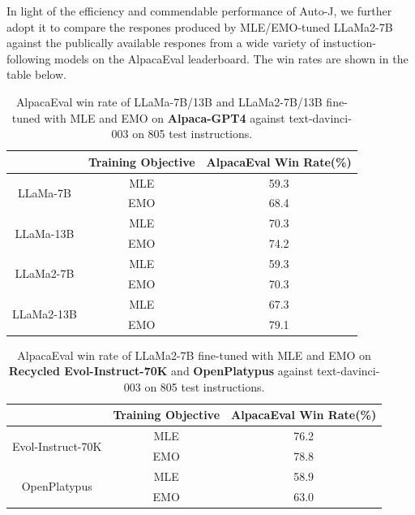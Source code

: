 In light of the efficiency and commendable performance of Auto-J, we further adopt it to compare the respones produced by MLE/EMO-tuned LLaMa2-7B against the publically available respones from a wide variety of instuction-following models on the AlpacaEval leaderboard. The win rates are shown in the table below.

\begin{table}[t]
    \centering
    \begin{tabular}{cc|c}
    \toprule
                              & \textbf{Training Objective} & \textbf{AlpacaEval Win Rate(\%)} \\
    \midrule
    \multirow{2}{*}{LLaMa-7B}  & MLE                & 59.3                \\
                               & EMO                & 68.4                \\
    \midrule
    \multirow{2}{*}{LLaMa-13B} & MLE                & 70.3                \\
                               & EMO                & 74.2                \\
    \midrule
    \multirow{2}{*}{LLaMa2-7B}  & MLE                & 59.3                \\
                               & EMO                &  70.3               \\
    \midrule
    \multirow{2}{*}{LLaMa2-13B} & MLE                & 67.3                \\
                               & EMO                & 79.1                \\
    \bottomrule
    \end{tabular}
    \label{table:alpacaeval}
    \caption{AlpacaEval win rate of LLaMa-7B/13B and LLaMa2-7B/13B fine-tuned with MLE and EMO on \textbf{Alpaca-GPT4} against text-davinci-003 on 805 test instructions.}
\end{table}

\begin{table}[t]
    \centering
    \begin{tabular}{cc|c}
    \toprule
                              & \textbf{Training Objective} & \textbf{AlpacaEval Win Rate(\%)} \\
    \midrule
    \multirow{2}{*}{Evol-Instruct-70K}  & MLE                & 76.2                \\
                               & EMO                &  78.8               \\
    \midrule
    \multirow{2}{*}{OpenPlatypus} & MLE                & 58.9                \\
                               & EMO                & 63.0                \\
    \bottomrule
    \end{tabular}
    \label{table:alpacaeval_evol}
    \caption{AlpacaEval win rate of LLaMa2-7B fine-tuned with MLE and EMO on \textbf{Recycled Evol-Instruct-70K} and \textbf{OpenPlatypus} against text-davinci-003 on 805 test instructions.}
\end{table}

